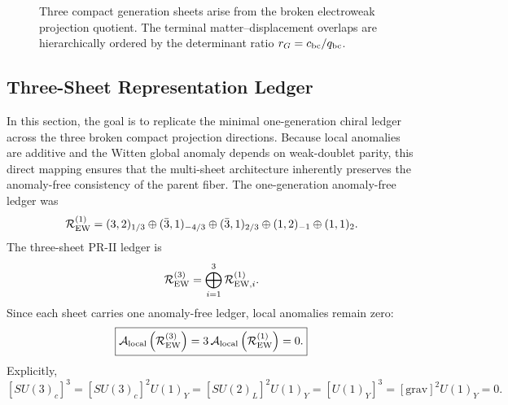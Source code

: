 \documentclass[11pt]{article}
\begin{document}
\begin{figure}[H]
\centering
{}
\caption{Three compact generation sheets arise from the broken electroweak projection quotient. The terminal matter--displacement overlaps are hierarchically ordered by the determinant ratio $r_G=c_{\rm bc}/q_{\rm bc}$.}
\label{fig:pr2_generation_sheet_overlap}
\end{figure}

\subsection{Three-Sheet Representation Ledger}
\label{sec:pr2_three_sheet_representation_ledger}
In this section, the goal is to replicate the minimal one-generation chiral ledger across the three broken compact projection directions. Because local anomalies are additive and the Witten global anomaly depends on weak-doublet parity, this direct mapping ensures that the multi-sheet architecture inherently preserves the anomaly-free consistency of the parent fiber. The one-generation anomaly-free ledger was
\begin{equation}
\mathcal R_{\rm EW}^{(1)}
=
(3,2)_{1/3}
\oplus
(\bar3,1)_{-4/3}
\oplus
(\bar3,1)_{2/3}
\oplus
(1,2)_{-1}
\oplus
(1,1)_2.
\end{equation}
The three-sheet PR-II ledger is
\begin{equation}
\mathcal R_{\rm EW}^{(3)}
=
\bigoplus_{i=1}^{3}
\mathcal R_{{\rm EW},i}^{(1)}.
\end{equation}
Since each sheet carries one anomaly-free ledger, local anomalies remain zero:
\begin{equation}
\boxed{
\mathcal A_{\rm local}
\left(
\mathcal R_{\rm EW}^{(3)}
\right)
=
3\,
\mathcal A_{\rm local}
\left(
\mathcal R_{\rm EW}^{(1)}
\right)
=
0.
}
\end{equation}
Explicitly,
\begin{equation}
\boxed{
[SU(3)_c]^3
=
[SU(3)_c]^2U(1)_Y
=
[SU(2)_L]^2U(1)_Y
=
[U(1)_Y]^3
=
[\mathrm{grav}]^2U(1)_Y
=
0.
}
\end{equation}
\end{document}
